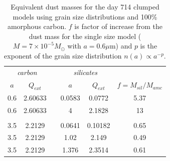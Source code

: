 \begin{table}
	\caption{Equivalent dust masses for the day 714 clumped models using grain size distributions and 100\% amorphous carbon. $f$ is factor of increase from the dust mass for the single size model ($M=7 \times 10^{-5} M_{\odot}$ with $a=0.6 \mu$m) and $p$ is the exponent of the grain size distribution $n(a) \propto a^{-p}$.}
	\label{tb_sil}
	\begin{center}
  	\begin{tabular}{@{} cccccc @{}}
    	\hline
	\multicolumn{2}{c}{\textit{carbon}} && \multicolumn{2}{c}{\textit{silicates}} & \\
$a$ & $Q_{ext}$ & &$a$& $Q_{ext}$ & $f=M_{sil}/M_{amc}$ \\
\hline
0.6 & 2.60633 & &0.0583 & 0.0772 & 5.37 \\
0.6 & 2.60633 & &4 & 2.1828 & 13 \\
 \\
3.5 & 2.2129 & &0.0641 & 0.10182 & 0.65 \\
3.5 & 2.2129 & &1.02 & 2.149 & 0.49 \\
3.5 & 2.2129 & &1.376 & 2.3514 & 0.61 \\


    \hline
  \end{tabular}
  \end{center}
\end{table}









